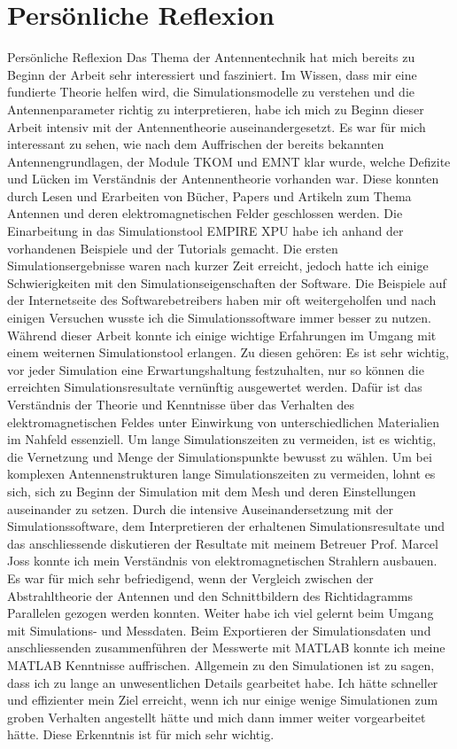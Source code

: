 \section{Persönliche Reflexion}
Persönliche Reflexion
Das Thema der Antennentechnik hat mich bereits zu Beginn der Arbeit sehr interessiert und fasziniert. Im Wissen, dass mir eine fundierte Theorie helfen wird, die Simulationsmodelle zu verstehen und die Antennenparameter richtig zu interpretieren, habe ich mich zu Beginn dieser Arbeit intensiv mit der Antennentheorie auseinandergesetzt. Es war für mich interessant zu sehen, wie nach dem Auffrischen der bereits bekannten Antennengrundlagen, der Module TKOM und EMNT klar wurde, welche Defizite und Lücken im Verständnis der Antennentheorie vorhanden war. Diese konnten durch Lesen und Erarbeiten von Bücher, Papers und Artikeln zum Thema Antennen und deren elektromagnetischen Felder geschlossen werden. 
Die Einarbeitung in das Simulationstool EMPIRE XPU habe ich anhand der vorhandenen Beispiele und der Tutorials gemacht. Die ersten Simulationsergebnisse waren nach kurzer Zeit erreicht, jedoch hatte ich einige Schwierigkeiten mit den Simulationseigenschaften der Software. Die Beispiele auf der Internetseite des Softwarebetreibers haben mir oft weitergeholfen und nach einigen Versuchen wusste ich die Simulationssoftware immer besser zu nutzen. Während dieser Arbeit konnte ich einige wichtige Erfahrungen im Umgang mit einem weiternen Simulationstool erlangen. Zu diesen gehören: Es ist sehr wichtig, vor jeder Simulation eine Erwartungshaltung festzuhalten, nur so können die erreichten Simulationsresultate vernünftig ausgewertet werden. Dafür ist das Verständnis der Theorie und Kenntnisse über das Verhalten des elektromagnetischen Feldes unter Einwirkung von unterschiedlichen Materialien im Nahfeld essenziell. Um lange Simulationszeiten zu vermeiden, ist es wichtig, die Vernetzung und Menge der Simulationspunkte bewusst zu wählen. Um bei komplexen Antennenstrukturen lange Simulationszeiten zu vermeiden, lohnt es sich, sich zu Beginn der Simulation mit dem Mesh und deren Einstellungen auseinander zu setzen. Durch die intensive Auseinandersetzung mit der Simulationssoftware, dem Interpretieren der erhaltenen  Simulationsresultate und das anschliessende diskutieren der Resultate mit meinem Betreuer Prof. Marcel Joss konnte ich mein Verständnis von elektromagnetischen Strahlern ausbauen. Es war für mich sehr befriedigend, wenn der Vergleich zwischen der Abstrahltheorie der Antennen und den Schnittbildern des Richtidagramms Parallelen gezogen werden konnten. Weiter habe ich viel gelernt beim Umgang mit Simulations- und Messdaten. Beim Exportieren der Simulationsdaten und anschliessenden zusammenführen der Messwerte mit MATLAB konnte ich meine MATLAB Kenntnisse auffrischen. Allgemein zu den Simulationen ist zu sagen, dass ich zu lange an unwesentlichen Details gearbeitet habe. Ich hätte schneller und effizienter mein Ziel erreicht, wenn ich nur einige wenige Simulationen zum groben Verhalten angestellt hätte und mich dann immer weiter vorgearbeitet hätte. Diese Erkenntnis ist für mich sehr wichtig.
